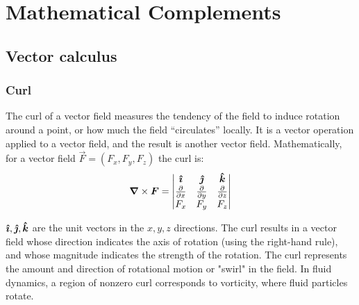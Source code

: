 \appendix
\chapter{Mathematical Complements}\label{ch:appendixA}

\section{Vector calculus}\label{sec:vector-calc}
\subsection{Curl}\label{subsec:curl}
The curl of a vector field measures the tendency of the field to induce rotation around a point, or how much the field ``circulates'' locally.
It is a vector operation applied to a vector field, and the result is another vector field. Mathematically, for a vector field $\vec{F}=(F_x, F_y, F_z)$ the curl is:
\begin{equation}
	\curl{\vec{F}}=
	\begin{vmatrix}
		\unitv{\imath}              & \unitv{\jmath}              & \unitv{k}                   \\
		\frac{\partial}{\partial x} & \frac{\partial}{\partial y} & \frac{\partial}{\partial z} \\
		F_x                         & F_y                         & F_z
	\end{vmatrix}
	\label{eq:curl-def}
\end{equation}

$\bm{\hat{\imath}}, \bm{\hat{\jmath}}, \bm{\hat{k}}$ are the unit vectors in the $x,y,z$ directions.
The curl results in a vector field whose direction indicates the axis of rotation (using the right-hand rule), and whose magnitude indicates the strength of the rotation.  The curl represents the amount and direction of rotational motion or "swirl" in the field. In fluid dynamics, a region of nonzero curl corresponds to vorticity, where fluid particles rotate.

